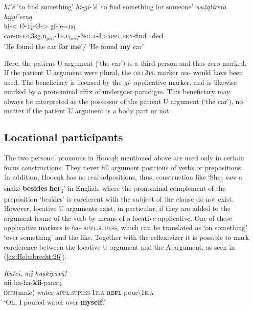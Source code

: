 \documentclass[output=paper]{langscibook}
\begin{document}
\ea  \label{ex:Helmbrecht:25}
  \ea \textit{hi'é} 'to find something'
  \ex \textit{  hi-gi-'é} 'to find something for someone'
  \ex \textit{ wažątírera hįįgí'eeną  }  \\
	 {hi-< Ø-hį-Ø{}-> gí-'e=ną}\\
	{car-\textsc{def}}{<3sg.u\textsubscript{pat}-\textsc{1e.u}\textsubscript{ben}-3\textsc{sg.a}-3>\textsc{appl.ben}-find=decl}\\
 \glt `He found the car \textbf{for} \textbf{me}'/ `He found \textbf{my} car' \citep[29]{helmbrecht2003possession}
 \z 
\z 

Here, the patient U argument (`the car') is a third person and thus zero marked. If the patient U argument were plural, the \textsc{obj}.3\textsc{pl} marker \textit{wa-} would have been used. The beneficiary is licensed by the \textit{gi-} applicative marker, and is likewise marked by a pronominal affix of undergoer paradigm. This beneficiary may always be interpreted as the possessor of the patient U argument (`the car'), no matter if the patient U argument is a body part or not.

\subsection{Locational participants}\label{sec:Helmbrecht:5.2}

The two personal pronouns in Hoocąk mentioned above are used only in certain focus constructions. They never fill argument positions of verbs or prepositions. In addition, Hoocąk has no real adpositions, thus, construction like `She\textsubscript{1} saw a snake \textbf{besides} \textbf{her}\textsubscript{1}{}' in English, where the pronominal complement of the preposition `besides' is coreferent with the subject of the clause do not exist. However, locative U arguments exist, in particular, if they are added to the argument frame of the verb by means of a locative applicative. One of these applicative markers is \textit{ha-} \textsc{appl.supess}, which can be translated as `on something' `over something' and the like. Together with the reflexivizer it is possible to mark coreference between the locative U argument and the A argument, as seen in (\ref{ex:Helmbrecht:26}).

\ea   \label{ex:Helmbrecht:26}  \textit{Kutei, nįį haakipaxų́!} \\
  	 {nįį} {ha-ha-\textbf{kii}-paaxų}\\
  {\textsc{intj}(male)} {water} {\textsc{appl.supess}-\textsc{1e.a}-\textbf{\textsc{refl}}-pour{\textbackslash}1\textsc{e.a}}\\
	 \glt `Oh, I poured water over \textbf{myself}.' \citep[example No. 31]{Hartmann2013}
\z 
\end{document}
